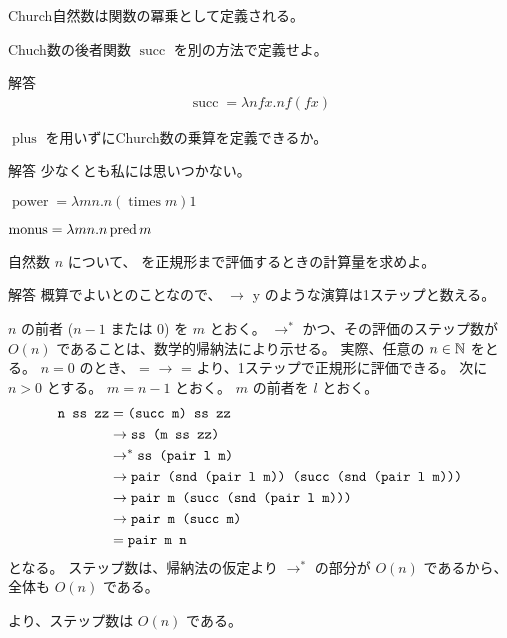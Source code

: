 Church自然数は関数の冪乗として定義される。

\begin{jexercise*}[5.2.2]
  Chuch数の後者関数 $\operatorname{succ}$ を別の方法で定義せよ。
\end{jexercise*}
\begin{itembox}[l]{解答}
  \begin{align*}
    \operatorname{succ} = \lambda n f x. n f (f x)
  \end{align*}
\end{itembox}

\begin{jexercise*}[5.2.3]
  $\operatorname{plus}$ を用いずにChurch数の乗算を定義できるか。
\end{jexercise*}
\begin{itembox}[l]{解答}
  少なくとも私には思いつかない。
\end{itembox}

\begin{jexercise*}[3.2.4]
  $\operatorname{power} = \lambda m n. n (\operatorname{times} m) 1$
\end{jexercise*}

\begin{jexercise*}[5.2.5]
  $\operatorname{monus} = \lambda m n. n \operatorname{pred} m$
\end{jexercise*}

\begin{jexercise*}[5.2.6]
  自然数 $n$ について、 を正規形まで評価するときの計算量を求めよ。
\end{jexercise*}
\begin{itembox}[l]{解答}
  概算でよいとのことなので、 $\to$ {y} のような演算は1ステップと数える。

  $n$ の前者 ($n - 1$ または $0$) を $m$ とおく。
   $\to^*$  かつ、その評価のステップ数が $O(n)$ であることは、数学的帰納法により示せる。
  実際、任意の $n \in \mathbb{N}$ をとる。
  $n = 0$ のとき、
    = 
    $\to$ 
    = 
  より、1ステップで正規形に評価できる。
  次に $n > 0$ とする。
  $m = n - 1$ とおく。
  $m$ の前者を $l$ とおく。
  \begin{align*}
    \texttt{n ss zz} & = \texttt{(succ m) ss zz}
    \\ & \to \texttt{ss (m ss zz)}
    \\ & \to^* \texttt{ss (pair l m)}
    \\ & \to \texttt{pair (snd (pair l m)) (succ (snd (pair l m)))}
    \\ & \to \texttt{pair m (succ (snd (pair l m)))}
    \\ & \to \texttt{pair m (succ m)}
    \\ & = \texttt{pair m n}
  \end{align*}
  となる。
  ステップ数は、帰納法の仮定より $\to^*$ の部分が $O(n)$ であるから、全体も $O(n)$ である。

   より、ステップ数は $O(n)$ である。
\end{itembox}
